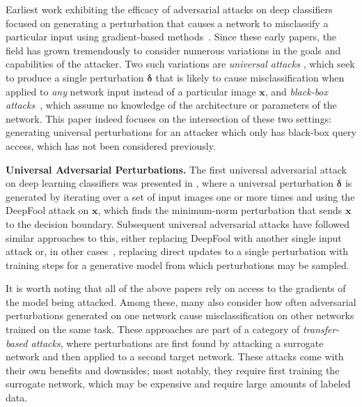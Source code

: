 \documentclass[letterpaper]{article}
\begin{document}
	Earliest work exhibiting the efficacy of adversarial attacks on deep classifiers focused on generating a perturbation that causes a network to misclassify a particular input using gradient-based methods~\cite{szegedy2013intriguing,goodfellow2014explaining,biggio2013evasion}. Since these early papers, the field has grown tremendously to consider numerous variations in the goals and capabilities of the attacker.  Two such variations are \textit{universal attacks} \cite{moosavi2017universal}, which seek to produce a single perturbation $\boldsymbol{\delta}$ that is likely to cause misclassification when applied to \textit{any} network input instead of a particular image $\boldsymbol{x}$, and \textit{black-box attacks}~\cite{zoo}, which assume no knowledge of the architecture or parameters of the network.  This paper indeed focuses on the intersection of these two settings: generating universal perturbations for an attacker which only has black-box query access, which has not been considered previously.
	
	
	\textbf{Universal Adversarial Perturbations.} The first universal adversarial attack on deep learning classifiers was presented in \cite{moosavi2017universal}, where a universal perturbation $\boldsymbol{\delta}$ is generated by iterating over a set of input images one or more times and using the DeepFool attack \cite{moosavi2016deepfool} on $\boldsymbol{x}$, which finds the minimum-norm perturbation that sends $\boldsymbol{x}$ to the decision boundary. Subsequent universal adversarial attacks have followed similar approaches to this, either replacing DeepFool with another single input attack \cite{hirano2019simple} or, in other cases~\cite{hayes2018learning,reddy2018nag}, replacing direct updates to a single perturbation with training steps for a generative model from which perturbations may be sampled.
	
	It is worth noting that all of the above papers rely on access to the gradients of the model being attacked. Among these, many \cite{moosavi2017universal,hayes2018learning,reddy2018nag} also consider how often adversarial perturbations generated on one network cause misclassification on other networks trained on the same task. These approaches are part of a category of \textit{transfer-based attacks}, where perturbations are first found by attacking a surrogate network and then applied to a second target network. These attacks come with their own benefits and downsides; most notably, they require first training the surrogate network, which may be expensive and require large amounts of labeled data.
	
\end{document}

